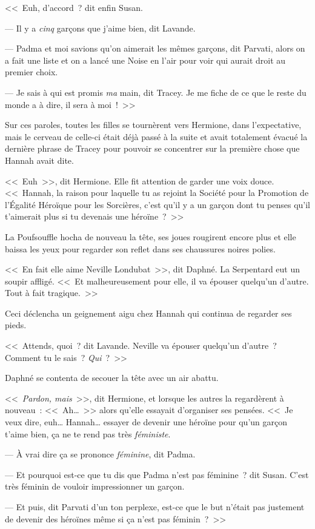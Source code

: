 <<~Euh, d'accord~? dit enfin Susan.

--- Il y a \emph{cinq} garçons que j'aime bien, dit Lavande.

--- Padma et moi savions qu'on aimerait les mêmes garçons, dit Parvati, alors on a fait une liste et on a lancé une Noise en l'air pour voir qui aurait droit au premier choix.

--- Je sais à qui est promis \emph{ma} main, dit Tracey. Je me fiche de ce que le reste du monde a à dire, il sera à moi~!~>>

Sur ces paroles, toutes les filles se tournèrent vers Hermione, dans l'expectative, mais le cerveau de celle-ci était déjà passé à la suite et avait totalement évacué la dernière phrase de Tracey pour pouvoir se concentrer sur la première chose que Hannah avait dite.

<<~Euh~>>, dit Hermione. Elle fit attention de garder une voix douce. <<~Hannah, la raison pour laquelle tu as rejoint la Société pour la Promotion de l'Égalité Héroïque pour les Sorcières, c'est qu'il y a un garçon dont tu penses qu'il t'aimerait plus si tu devenais une héroïne~?~>>

La Poufsouffle hocha de nouveau la tête, ses joues rougirent encore plus et elle baissa les yeux pour regarder son reflet dans ses chaussures noires polies.

<<~En fait elle aime Neville Londubat~>>, dit Daphné. La Serpentard eut un soupir affligé. <<~Et malheureusement pour elle, il va épouser quelqu'un d'autre. Tout à fait tragique.~>>

Ceci déclencha un geignement aigu chez Hannah qui continua de regarder ses pieds.

<<~Attends, quoi~? dit Lavande. Neville va épouser quelqu'un d'autre~? Comment tu le sais~? \emph{Qui}~?~>>

Daphné se contenta de secouer la tête avec un air abattu.

<<~\emph{Pardon, mais}~>>, dit Hermione, et lorsque les autres la regardèrent à nouveau~: <<~Ah…~>> alors qu'elle essayait d'organiser ses pensées. <<~Je veux dire, euh… Hannah… essayer de devenir une héroïne pour qu'un garçon t'aime bien, ça ne te rend pas très \emph{féministe}.

--- À vrai dire ça se prononce \emph{féminine}, dit Padma.

--- Et pourquoi est-ce que tu dis que Padma n'est pas féminine~? dit Susan. C'est très féminin de vouloir impressionner un garçon.

--- Et puis, dit Parvati d'un ton perplexe, est-ce que le but n'était pas justement de devenir des héroïnes même si ça n'est pas féminin~?~>>

